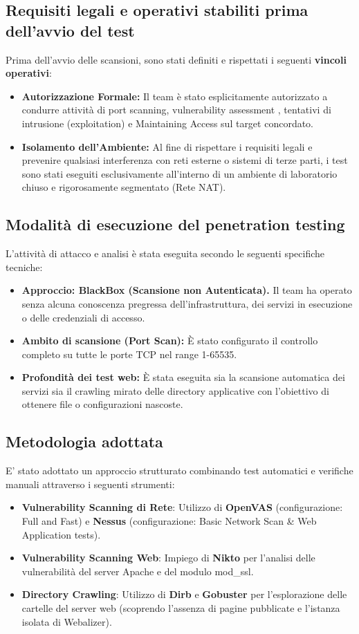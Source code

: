 \documentclass[12pt, a4paper]{article}
\begin{document}
	\subsection{Requisiti legali e operativi stabiliti prima dell’avvio del test}
	Prima dell'avvio delle scansioni, sono stati definiti e rispettati i seguenti \textbf{vincoli operativi}:
	\begin{itemize}
		\item \textbf{Autorizzazione Formale:} Il team è stato esplicitamente autorizzato a condurre attività di port scanning, vulnerability assessment , tentativi di intrusione (exploitation) e Maintaining Access sul target concordato.
		\item \textbf{Isolamento dell'Ambiente:} Al fine di rispettare i requisiti legali e prevenire qualsiasi interferenza con reti esterne o sistemi di terze parti, i test sono stati eseguiti esclusivamente all'interno di un ambiente di laboratorio chiuso e rigorosamente segmentato (Rete NAT).
	\end{itemize}

	\subsection{Modalità di esecuzione del penetration testing}
	L'attività di attacco e analisi è stata eseguita secondo le seguenti specifiche tecniche:
	\begin{itemize}
		\item \textbf{Approccio: BlackBox (Scansione non Autenticata).} Il team ha operato senza alcuna conoscenza pregressa dell'infrastruttura, dei servizi in esecuzione o delle credenziali di accesso.
		\item \textbf{Ambito di scansione (Port Scan):} È stato configurato il controllo completo su tutte le porte TCP nel range 1-65535.
		\item \textbf{Profondità dei test web:} È stata eseguita sia la scansione automatica dei servizi sia il crawling mirato delle directory applicative con l'obiettivo di ottenere file o configurazioni nascoste.
	\end{itemize}

	\newpage
	\subsection{Metodologia adottata}
	E' stato adottato un approccio strutturato combinando test automatici e verifiche manuali attraverso i seguenti strumenti:
	\begin{itemize}
		\item \textbf{Vulnerability Scanning di Rete}: Utilizzo di \textbf{OpenVAS} (configurazione: Full and Fast) e \textbf{Nessus} (configurazione: Basic Network Scan \& Web Application tests).
		\item \textbf{Vulnerability Scanning Web}: Impiego di \textbf{Nikto} per l'analisi delle vulnerabilità del server Apache e del modulo mod\_ssl.
		\item \textbf{Directory Crawling}: Utilizzo di \textbf{Dirb} e \textbf{Gobuster} per l'esplorazione delle cartelle del server web (scoprendo l'assenza di pagine pubblicate e l'istanza isolata di Webalizer).
	\end{itemize}
\end{document}
